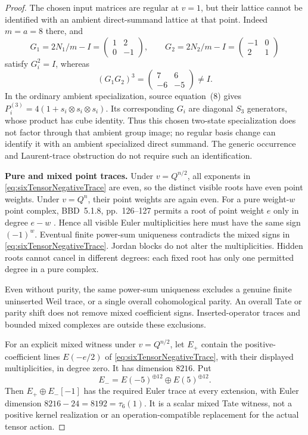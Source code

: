 \begin{proof}
The chosen input matrices are regular at \(v=1\),
but their lattice cannot be identified with an
ambient direct-summand lattice at that point.
Indeed \(m=a=8\) there, and
\[
 G_1=2N_1/m-I=\begin{pmatrix}1&2\\0&-1\end{pmatrix},
 \qquad
 G_2=2N_2/m-I=\begin{pmatrix}-1&0\\2&1\end{pmatrix}
\]
satisfy \(G_i^2=I\), whereas
\begin{equation}\label{eq:sixTensorSpecializationBoundary}
             (G_1G_2)^3
               =\begin{pmatrix}7&6\\-6&-5\end{pmatrix}\ne I.
\end{equation}
In the ordinary ambient specialization, source
equation~(8) gives
\(P_i^{(3)}=4(1+s_i\otimes s_i\otimes s_i)\).
Its corresponding \(G_i\) are diagonal \(S_3\)
generators, whose product has cube identity.
Thus this chosen two-state specialization does
not factor through that ambient group image;
no regular basis change can identify it with
an ambient specialized direct summand.
The generic occurrence and Laurent-trace
obstruction do not require such an identification.

\par\smallskip\noindent\textbf{Pure and mixed point traces.}\quad
Under \(v=Q^{n/2}\), all exponents in
\eqref{eq:sixTensorNegativeTrace} are even, so
the distinct visible roots have even point weights.
Under \(v=Q^n\), their point weights are again
even. For a pure weight-\(w\) point complex,
BBD~5.1.8, pp.~126--127 permits a root of
point weight \(e\) only in degree \(e-w\)
\cite{BBD}. Hence all visible Euler multiplicities
here must have the same sign \((-1)^w\).
Eventual finite power-sum uniqueness contradicts
the mixed signs in
\eqref{eq:sixTensorNegativeTrace}.
Jordan blocks do not alter the multiplicities.
Hidden roots cannot cancel in different degrees:
each fixed root has only one permitted degree
in a pure complex.

Even without purity, the same power-sum uniqueness
excludes a genuine finite uninserted Weil trace,
or a single overall cohomological parity.
An overall Tate or parity shift does not
remove mixed coefficient signs.
Inserted-operator traces and bounded mixed
complexes are outside these exclusions.

For an explicit mixed witness under
\(v=Q^{n/2}\), let \(E_+\) contain the
positive-coefficient lines \(E(-e/2)\) of
\eqref{eq:sixTensorNegativeTrace}, with their
displayed multiplicities, in degree zero.
It has dimension \(8216\).
Put
\[
 E_-=E(-5)^{\oplus12}\oplus E(5)^{\oplus12}.
\]
Then \(E_+\oplus E_-[-1]\) has the required
Euler trace at every extension, with Euler
dimension \(8216-24=8192=\tau_6(1)\).
It is a scalar mixed Tate witness, not a
positive kernel realization or an
operation-compatible replacement for the
actual tensor action.
\end{proof}

